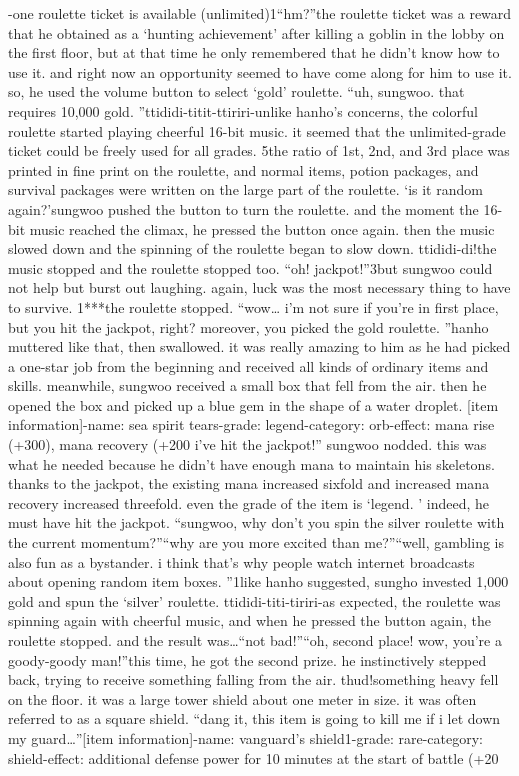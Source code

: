-one roulette ticket is available (unlimited)1“hm?”the roulette ticket was a reward that he obtained as a ‘hunting achievement’ after killing a goblin in the lobby on the first floor, but at that time he only remembered that he didn’t know how to use it.
 and right now an opportunity seemed to have come along for him to use it.
 so, he used the volume button to select ‘gold’ roulette.
“uh, sungwoo.
 that requires 10,000 gold.
”ttididi-titit-ttiriri-unlike hanho’s concerns, the colorful roulette started playing cheerful 16-bit music.
 it seemed that the unlimited-grade ticket could be freely used for all grades.
5the ratio of 1st, 2nd, and 3rd place was printed in fine print on the roulette, and normal items, potion packages, and survival packages were written on the large part of the roulette.
‘is it random again?’sungwoo pushed the button to turn the roulette.
 and the moment the 16-bit music reached the climax, he pressed the button once again.
 then the music slowed down and the spinning of the roulette began to slow down.
ttididi-di!the music stopped and the roulette stopped too.
“oh! jackpot!”3but sungwoo could not help but burst out laughing.
again, luck was the most necessary thing to have to survive.
1***the roulette stopped.
“wow… i’m not sure if you’re in first place, but you hit the jackpot, right? moreover, you picked the gold roulette.
”hanho muttered like that, then swallowed.
 it was really amazing to him as he had picked a one-star job from the beginning and received all kinds of ordinary items and skills.
meanwhile, sungwoo received a small box that fell from the air.
 then he opened the box and picked up a blue gem in the shape of a water droplet.
[item information]-name: sea spirit tears-grade: legend-category: orb-effect: mana rise (+300), mana recovery (+200%
 i’ve hit the jackpot!” sungwoo nodded.
 this was what he needed because he didn’t have enough mana to maintain his skeletons.
 thanks to the jackpot, the existing mana increased sixfold and increased mana recovery increased threefold.
even the grade of the item is ‘legend.
’ indeed, he must have hit the jackpot.
“sungwoo, why don’t you spin the silver roulette with the current momentum?”“why are you more excited than me?”“well, gambling is also fun as a bystander.
 i think that’s why people watch internet broadcasts about opening random item boxes.
”1like hanho suggested, sungho invested 1,000 gold and spun the ‘silver’ roulette.
ttididi-titi-tiriri-as expected, the roulette was spinning again with cheerful music, and when he pressed the button again, the roulette stopped.
and the result was…“not bad!”“oh, second place! wow, you’re a goody-goody man!”this time, he got the second prize.
 he instinctively stepped back, trying to receive something falling from the air.
thud!something heavy fell on the floor.
 it was a large tower shield about one meter in size.
 it was often referred to as a square shield.
“dang it, this item is going to kill me if i let down my guard…”[item information]-name: vanguard’s shield1-grade: rare-category: shield-effect: additional defense power for 10 minutes at the start of battle (+20%

